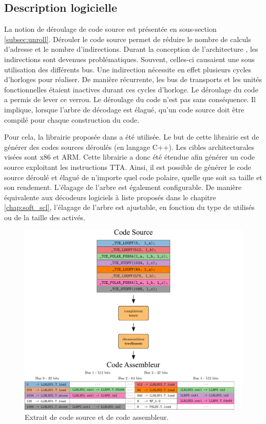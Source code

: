 \subsection{Description logicielle}

La notion de déroulage de code source est présentée en sous-section \ref{subsec:unroll}. Dérouler le code source permet de réduire le nombre de calculs d'adresse et le nombre d'indirections. Durant la conception de l'architecture \TTSC, les indirections sont devenues problématiques. Souvent, celles-ci causaient une sous utilisation des différents bus. Une indirection nécessite en effet plusieurs cycles d'horloges pour réaliser. De manière récurrente, les bus de transports et les unités fonctionnelles étaient inactives durant ces cycles d'horloge. Le déroulage du code a permis de lever ce verrou. Le déroulage du code n'est pas sans conséquence. Il implique, lorsque l'arbre de décodage est élagué, qu'un code source doit être compilé pour chaque construction du code.

Pour cela, la librairie proposée dans \cite{cassagne_efficient_2015} a été utilisée. Le but de cette librairie est de générer des codes sources déroulés (en langage C++). Les cibles architecturales visées sont x86 et ARM. Cette librairie a donc été étendue afin générer un code source exploitant les instructions TTA. Ainsi, il est possible de générer le code source déroulé et élagué de n'importe quel code polaire, quelle que soit sa taille et son rendement. L'élagage de l'arbre est également configurable. De manière équivalente aux décodeurs logiciels à liste proposés dans le chapitre \ref{chap:soft_scl}, l'élagage de l'arbre est ajustable, en fonction du type de \noeuds utilisés ou de la taille des \noeuds activés.


\begin{figure}[t]
\centering
\includegraphics[width=\textwidth]{main/ch4_fig/ilp_1}
\caption{Extrait de code source et de code assembleur.}
\label{fig:ilp_1}
\end{figure}


